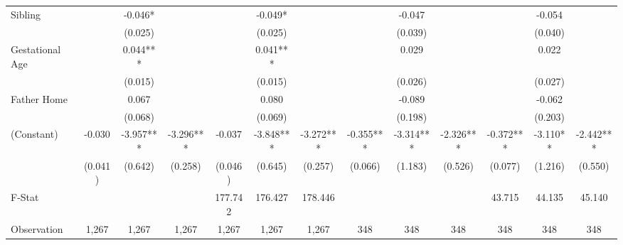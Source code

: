\begin{tabular}{lcccccccccccc}
Sibling &  & -0.046* &  &  & -0.049* &  &  & -0.047 &  &  & -0.054 &  \\
 &  & (0.025) &  &  & (0.025) &  &  & (0.039) &  &  & (0.040) &  \\
Gestational Age &  & 0.044*** &  &  & 0.041*** &  &  & 0.029 &  &  & 0.022 &  \\
 &  & (0.015) &  &  & (0.015) &  &  & (0.026) &  &  & (0.027) &  \\
Father Home &  & 0.067 &  &  & 0.080 &  &  & -0.089 &  &  & -0.062 &  \\
 &  & (0.068) &  &  & (0.069) &  &  & (0.198) &  &  & (0.203) &  \\
(Constant) & -0.030 & -3.957*** & -3.296*** & -0.037 & -3.848*** & -3.272*** & -0.355*** & -3.314*** & -2.326*** & -0.372*** & -3.110** & -2.442*** \\
 & (0.041) & (0.642) & (0.258) & (0.046) & (0.645) & (0.257) & (0.066) & (1.183) & (0.526) & (0.077) & (1.216) & (0.550) \\
\midrule 
F-Stat &  &  &  & 177.742 & 176.427 & 178.446 &  &  &  & 43.715 & 44.135 & 45.140 \\
Observation & 1,267 & 1,267 & 1,267 & 1,267 & 1,267 & 1,267 & 348 & 348 & 348 & 348 & 348 & 348 \\
\midrule 
\bottomrule 
\end{tabular}
